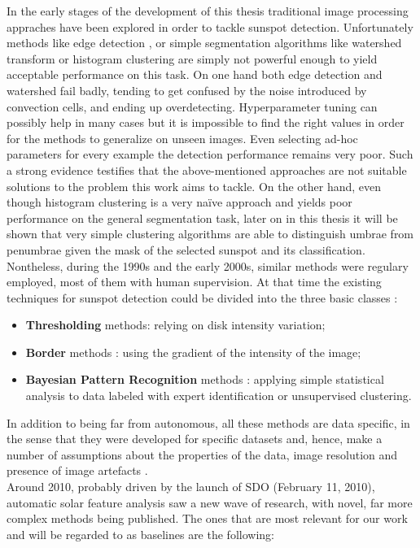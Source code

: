 In the early stages of the development of this thesis traditional image processing appraches have been explored in order to tackle sunspot detection. Unfortunately methods like edge detection \cite{canny1987computational}, or simple segmentation algorithms like watershed transform \cite{beucher1992watershed} or histogram clustering \cite{puzicha1999histogram} are simply not powerful enough to yield acceptable performance on this task. On one hand both edge detection and watershed fail badly, tending to get confused by the noise introduced by convection cells, and ending up overdetecting. Hyperparameter tuning can possibly help in many cases but it is impossible to find the right values in order for the methods to generalize on unseen images. Even selecting ad-hoc parameters for every example the detection performance remains very poor. Such a strong evidence testifies that the above-mentioned approaches are not suitable solutions to the problem this work aims to tackle. On the other hand, even though histogram clustering is a very na\"{i}ve approach and yields poor performance on the general segmentation task, later on in this thesis it will be shown that very simple clustering algorithms are able to distinguish umbrae from penumbrae given the mask of the selected sunspot and its classification.\\
Nontheless, during the 1990s and the early 2000s, similar methods were regulary employed, most of them with human supervision. At that time the existing techniques for sunspot detection could be divided into the three basic classes \cite{zharkov2004}:
\begin{itemize}
  \item \textbf{Thresholding} methods: relying on disk intensity variation;
  \item \textbf{Border} methods \cite{pettauer1997novel}: using the gradient of the intensity of the image;
  \item \textbf{Bayesian Pattern Recognition} methods \cite{turmon2002statistical}: applying simple statistical analysis to data labeled with expert identification or unsupervised clustering.
\end{itemize}
In addition to being far from autonomous, all these methods are data specific, in the sense that they were developed for specific datasets and, hence, make a number of assumptions about the properties of the data, image resolution and presence of image artefacts \cite{zharkov2004}.\\
Around 2010, probably driven by the launch of SDO (February 11, 2010), automatic solar feature analysis saw a new wave of research, with novel, far more complex methods being published. The ones that are most relevant for our work and will be regarded to as baselines are the following:
